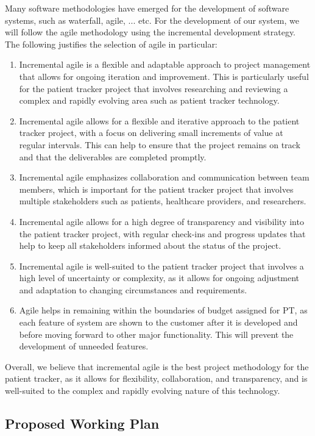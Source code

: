 \documentclass[12pt]{article}
\begin{document}
			\quad Many software methodologies have emerged for the development of software systems, such as waterfall, agile, ... etc. For the development of our system, we will follow the agile methodology using the incremental development strategy. The following justifies the selection of agile in particular:
				\begin{enumerate}
				\item Incremental agile is a flexible and adaptable approach to project management that allows for ongoing iteration and improvement. This is particularly useful for the patient tracker project that involves researching and reviewing a complex and rapidly evolving area such as patient tracker technology.
				\item Incremental agile allows for a flexible and iterative approach to the patient tracker project, with a focus on delivering small increments of value at regular intervals. This can help to ensure that the project remains on track and that the deliverables are completed promptly.
				\item Incremental agile emphasizes collaboration and communication between team members, which is important for the patient tracker project that involves multiple stakeholders such as patients, healthcare providers, and researchers.
				\item Incremental agile allows for a high degree of transparency and visibility into the patient tracker project, with regular check-ins and progress updates that help to keep all stakeholders informed about the status of the project.
				\item Incremental agile is well-suited to the patient tracker project that involves a high level of uncertainty or complexity, as it allows for ongoing adjustment and adaptation to changing circumstances and requirements.
				\item Agile helps in remaining within the boundaries of budget assigned for PT, as each feature of system are shown to the customer after it is developed and before moving forward to other major functionality. This will prevent the development of unneeded features.
				\end{enumerate}
				
			Overall, we believe that incremental agile is the best project methodology for the patient tracker, as it allows for flexibility, collaboration, and transparency, and is well-suited to the complex and rapidly evolving nature of this technology.
						
		\subsection{Proposed Working Plan}
		
\end{document}
